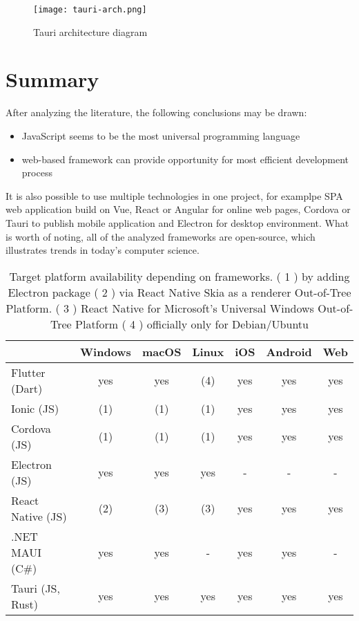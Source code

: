 \begin{figure}[H]
    \centering
    \texttt{[image: tauri-arch.png]}
    \caption[Tauri architecture]{\label{fig:tauri} Tauri architecture diagram }
\end{figure}


\section{{Summary}}%
\label{sec:literature_summary}

After analyzing the literature, the following conclusions may be drawn:
\begin{itemize}
    \item JavaScript seems to be the most universal programming language
    \item web-based framework can provide opportunity for most efficient development process
\end{itemize}

It is also possible to use multiple technologies in one project, for examplpe SPA web application build on Vue, React or Angular for online web pages, Cordova or Tauri to publish mobile application and Electron for desktop environment. 
What is worth of noting, all of the analyzed frameworks are open-source, which illustrates trends in today's computer science.


\begin{table}[H]
    \centering
    \begin{tabular}{lcccccc}
      \toprule
                        & Windows &  macOS  & Linux &  iOS  & Android &  Web  \\
      \midrule
      Flutter (Dart)    &   yes   &   yes   &  (4)  &  yes  &   yes   &  yes  \\
      Ionic (JS)        &   (1)   &   (1)   &  (1)  &  yes  &   yes   &  yes  \\
      Cordova (JS)      &   (1)   &   (1)   &  (1)  &  yes  &   yes   &  yes  \\
      Electron (JS)     &   yes   &   yes   &  yes  &  -    &    -    &  -    \\
      React Native (JS) &   (2)   &   (3)   &  (3)  &  yes  &   yes   &  yes  \\
      .NET MAUI (C\#)   &   yes   &   yes   &   -   &  yes  &   yes   &   -   \\
      Tauri (JS, Rust)  &   yes   &   yes   &  yes  &  yes  &   yes   &  yes  \\
      \bottomrule
    \end{tabular}
    \caption[Platform availability]{\label{tab:example}Target platform availability depending on frameworks.
    \newline ( 1 ) by adding Electron package
    \newline ( 2 ) via React Native Skia as a renderer Out-of-Tree Platform.
    \newline ( 3 ) React Native for Microsoft's Universal Windows Out-of-Tree Platform
    \newline ( 4 ) officially only for Debian/Ubuntu
    }
  
\end{table}